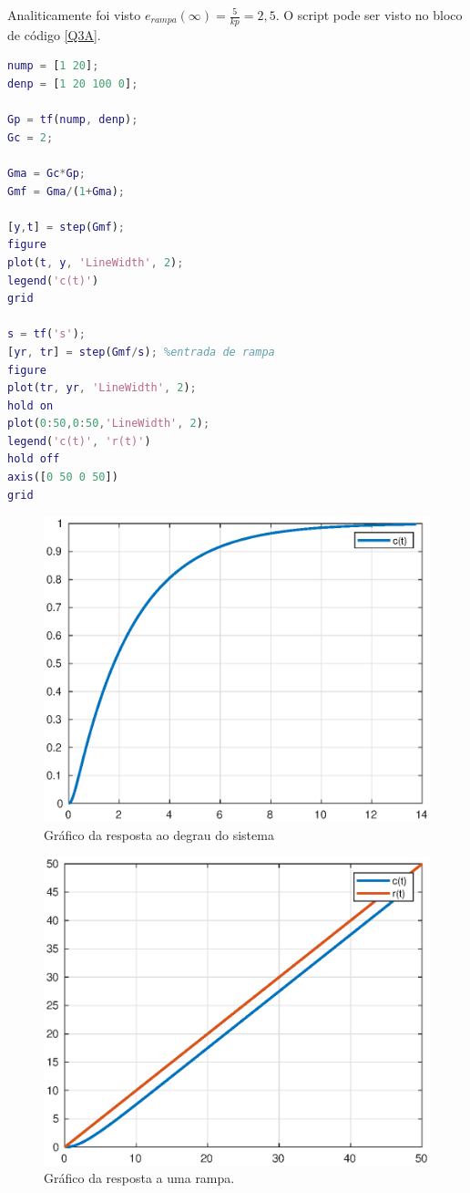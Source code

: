     Analiticamente foi visto $e_{rampa}(\infty)=\frac{5}{kp}=2,5$. O script pode ser visto no bloco de código \ref{Q3A}. 

\begin{lstlisting}[language=Matlab,label=Q3A,caption=Análise da estabilidade]
% a)
nump = [1 20];
denp = [1 20 100 0];

Gp = tf(nump, denp);
Gc = 2;

Gma = Gc*Gp;
Gmf = Gma/(1+Gma);

[y,t] = step(Gmf);
figure
plot(t, y, 'LineWidth', 2);
legend('c(t)')
grid

s = tf('s');
[yr, tr] = step(Gmf/s); %entrada de rampa
figure
plot(tr, yr, 'LineWidth', 2);
hold on
plot(0:50,0:50,'LineWidth', 2);
legend('c(t)', 'r(t)')
hold off
axis([0 50 0 50])
grid    
\end{lstlisting}

\begin{figure}[!ht]
    \centering
    \includegraphics[width = 0.75\linewidth]{Figuras/ProblemasPI/Problema3/step.eps}
    \caption{Gráfico da resposta ao degrau do sistema}
    \label{fig:Q3A1}                   
\end{figure}

\begin{figure}[!ht]
    \centering
    \includegraphics[width = 0.75\linewidth]{Figuras/ProblemasPI/Problema3/rampa.eps}
    \caption{Gráfico da resposta a uma rampa.}
    \label{fig:Q3A2}                   
\end{figure}

